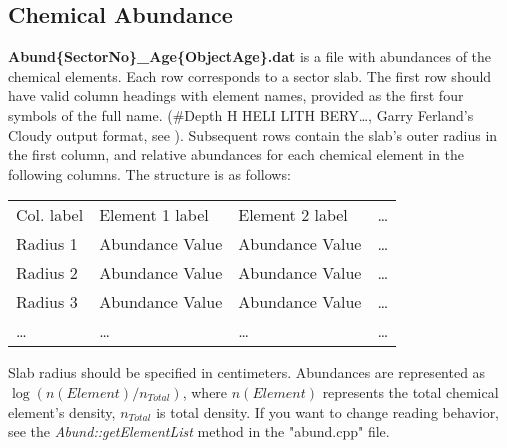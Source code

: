 \documentclass[a4paper]{article}
\begin{document}
\subsection{Chemical Abundance}
\label{dataAbund}
{\bf Abund\{SectorNo\}\_Age\{ObjectAge\}.dat} is a file with abundances of the chemical elements.
Each row corresponds to a sector slab.
The first row should have valid column headings with element names, provided as the first four symbols of the full name.
(\#Depth H HELI LITH BERY\ldots, Garry Ferland's Cloudy output format, see \cite{Cloudy}).
Subsequent rows contain the slab's outer radius in the first column, and relative abundances for
each chemical element in the following columns. The structure is as follows:
\begin{table}[H]
    \begin{tabular}{llll}
        Col. label & Element 1 label & Element 2 label & \ldots \\
        Radius 1 & Abundance Value & Abundance Value & \ldots \\
        Radius 2 & Abundance Value & Abundance Value & \ldots \\
        Radius 3 & Abundance Value & Abundance Value & \ldots \\
        \ldots & \ldots & \ldots & \ldots \\
    \end{tabular}
\end{table}
Slab radius should be specified in centimeters.
Abundances are represented as $\log(n(Element) / n_{Total})$, where $n(Element)$ represents the total chemical element's density,
$n_{Total}$ is total density.
If you want to change reading behavior, see the {\it Abund::getElementList} method in the "abund.cpp" file.
\end{document}
